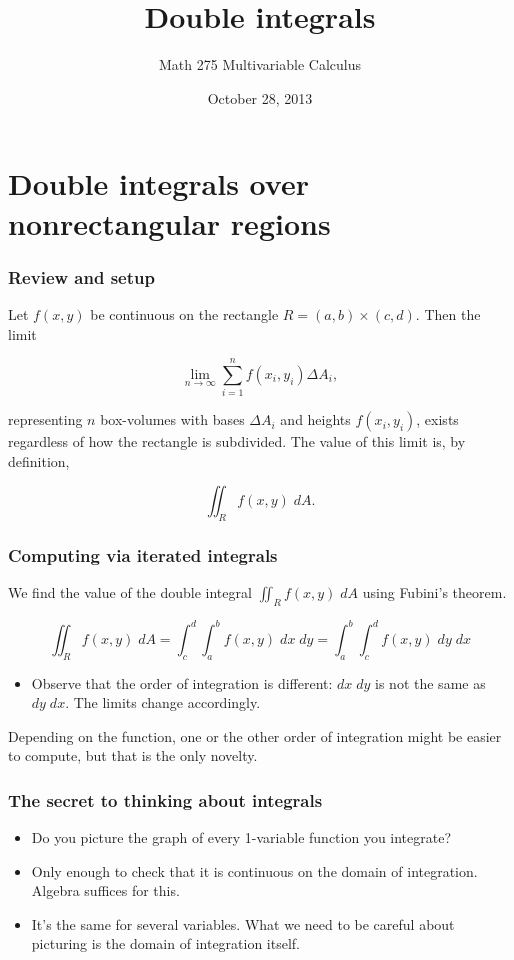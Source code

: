 \documentclass[11pt,ignorenonframetext,aspectratio=169,xcolor={svgnames}]{beamer}
\title{Double integrals}
\author{Math 275 Multivariable Calculus}
\date{October 28, 2013}
\begin{document}
\frame{\titlepage}

\section{Double integrals over nonrectangular regions}

\begin{frame}\frametitle{Review and setup}

Let $f(x,y)$ be continuous on the rectangle $R = (a,b) \times (c,d)$.
Then the limit

\[ \lim_{n \to \infty} \sum_{i=1}^n f(x_i, y_i) \Delta A_i, \]

representing $n$ box-volumes with bases $\Delta A_i$ and heights
$f(x_i,y_i)$, exists regardless of how the rectangle is subdivided. The
value of this limit is, by definition,

\[ \iint_R f(x,y) \; dA. \]

\end{frame}

\begin{frame}\frametitle{Computing via iterated integrals}

We find the value of the double integral $\iint_R f(x,y) \; dA$ using
Fubini's theorem.

\[ \iint_R f(x,y) \; dA = \int_c^d \int_a^b f(x,y) \; dx \; dy = \int_a^b \int_c^d f(x,y) \; dy \; dx \]

\begin{itemize}

\item
  Observe that the order of integration is different: $dx \; dy$ is not
  the same as $dy \; dx$. The limits change accordingly.
\end{itemize}

Depending on the function, one or the other order of integration might
be easier to compute, but that is the only novelty.

\end{frame}

\begin{frame}\frametitle{The secret to thinking about integrals}

\begin{itemize}

\item
  Do you picture the graph of every 1-variable function you integrate?
\item
  Only enough to check that it is continuous on the domain of
  integration. Algebra suffices for this.
\item
  It's the same for several variables. What we need to be careful about
  picturing is the domain of integration itself.
\end{itemize}

\end{frame}
\end{document}
